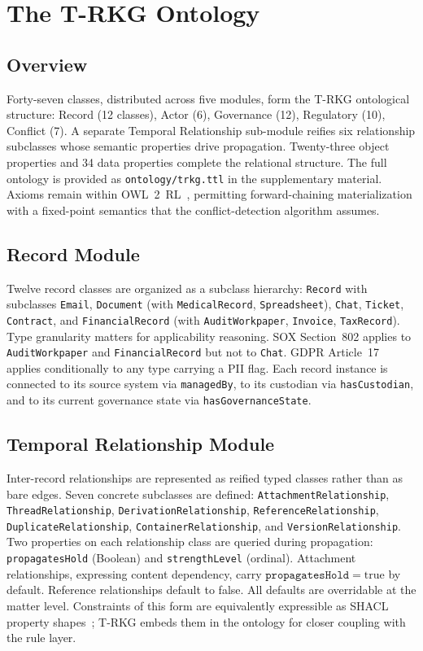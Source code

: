 \documentclass{ieeeaccess}
\begin{document}
\section{The T-RKG Ontology}

\subsection{Overview}

Forty-seven classes, distributed across five modules, form the T-RKG ontological structure: Record (12 classes), Actor (6), Governance (12), Regulatory (10), Conflict (7). A separate Temporal Relationship sub-module reifies six relationship subclasses whose semantic properties drive propagation. Twenty-three object properties and 34 data properties complete the relational structure. The full ontology is provided as \texttt{ontology/trkg.ttl} in the supplementary material. Axioms remain within OWL~2~RL~\cite{owl2}, permitting forward-chaining materialization with a fixed-point semantics that the conflict-detection algorithm assumes.

\subsection{Record Module}

Twelve record classes are organized as a subclass hierarchy: \texttt{Record} with subclasses \texttt{Email}, \texttt{Document} (with \texttt{MedicalRecord}, \texttt{Spreadsheet}), \texttt{Chat}, \texttt{Ticket}, \texttt{Contract}, and \texttt{FinancialRecord} (with \texttt{AuditWorkpaper}, \texttt{Invoice}, \texttt{TaxRecord}). Type granularity matters for applicability reasoning. SOX Section~802 applies to \texttt{AuditWorkpaper} and \texttt{FinancialRecord} but not to \texttt{Chat}. GDPR Article~17 applies conditionally to any type carrying a PII flag. Each record instance is connected to its source system via \texttt{managedBy}, to its custodian via \texttt{hasCustodian}, and to its current governance state via \texttt{hasGovernanceState}.

\subsection{Temporal Relationship Module}

Inter-record relationships are represented as reified typed classes rather than as bare edges. Seven concrete subclasses are defined: \texttt{AttachmentRelationship}, \texttt{ThreadRelationship}, \texttt{DerivationRelationship}, \texttt{ReferenceRelationship}, \texttt{DuplicateRelationship}, \texttt{ContainerRelationship}, and \texttt{VersionRelationship}. Two properties on each relationship class are queried during propagation: \texttt{propagatesHold} (Boolean) and \texttt{strengthLevel} (ordinal). Attachment relationships, expressing content dependency, carry $\texttt{propagatesHold} = \mathrm{true}$ by default. Reference relationships default to false. All defaults are overridable at the matter level. Constraints of this form are equivalently expressible as SHACL property shapes~\cite{shacl}; T-RKG embeds them in the ontology for closer coupling with the rule layer.
\end{document}
